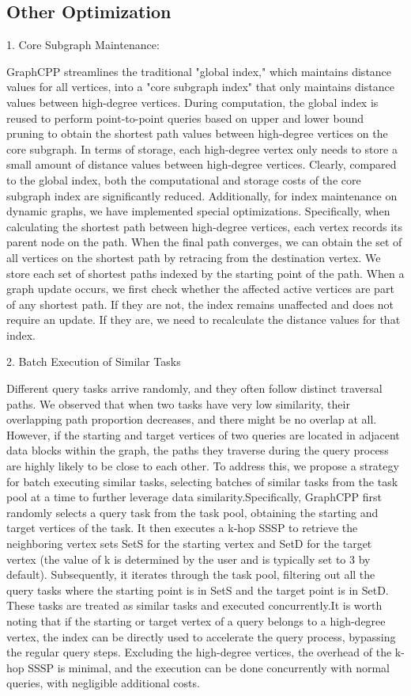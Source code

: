 \documentclass[lettersize,journal]{IEEEtran} %
\begin{document}
\subsection{Other Optimization}
1. Core Subgraph Maintenance:

GraphCPP streamlines the traditional "global index," which maintains distance values for all vertices, into a "core subgraph index" that only maintains distance values between high-degree vertices. During computation, the global index is reused to perform point-to-point queries based on upper and lower bound pruning to obtain the shortest path values between high-degree vertices on the core subgraph. In terms of storage, each high-degree vertex only needs to store a small amount of distance values between high-degree vertices. Clearly, compared to the global index, both the computational and storage costs of the core subgraph index are significantly reduced. Additionally, for index maintenance on dynamic graphs, we have implemented special optimizations. Specifically, when calculating the shortest path between high-degree vertices, each vertex records its parent node on the path. When the final path converges, we can obtain the set of all vertices on the shortest path by retracing from the destination vertex. We store each set of shortest paths indexed by the starting point of the path. When a graph update occurs, we first check whether the affected active vertices are part of any shortest path. If they are not, the index remains unaffected and does not require an update. If they are, we need to recalculate the distance values for that index.

2. Batch Execution of Similar Tasks

Different query tasks arrive randomly, and they often follow distinct traversal paths. We observed that when two tasks have very low similarity, their overlapping path proportion decreases, and there might be no overlap at all. However, if the starting and target vertices of two queries are located in adjacent data blocks within the graph, the paths they traverse during the query process are highly likely to be close to each other. To address this, we propose a strategy for batch executing similar tasks, selecting batches of similar tasks from the task pool at a time to further leverage data similarity.Specifically, GraphCPP first randomly selects a query task from the task pool, obtaining the starting and target vertices of the task. It then executes a k-hop SSSP to retrieve the neighboring vertex sets SetS for the starting vertex and SetD for the target vertex (the value of k is determined by the user and is typically set to 3 by default). Subsequently, it iterates through the task pool, filtering out all the query tasks where the starting point is in SetS and the target point is in SetD. These tasks are treated as similar tasks and executed concurrently.It is worth noting that if the starting or target vertex of a query belongs to a high-degree vertex, the index can be directly used to accelerate the query process, bypassing the regular query steps. Excluding the high-degree vertices, the overhead of the k-hop SSSP is minimal, and the execution can be done concurrently with normal queries, with negligible additional costs.
\end{document}
